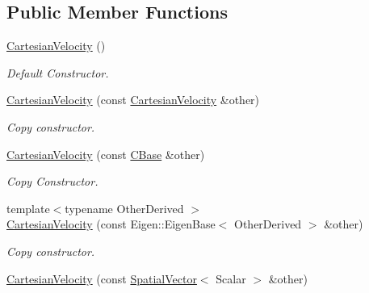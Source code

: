 \subsection*{Public Member Functions}
\begin{DoxyCompactItemize}
\item 
\hyperlink{classow__core_1_1CartesianVelocity_a9101c643b5b96005b9fa87439c6bf805}{Cartesian\+Velocity} ()\hypertarget{classow__core_1_1CartesianVelocity_a9101c643b5b96005b9fa87439c6bf805}{}\label{classow__core_1_1CartesianVelocity_a9101c643b5b96005b9fa87439c6bf805}

\begin{DoxyCompactList}\small\item\em Default Constructor. \end{DoxyCompactList}\item 
\hyperlink{classow__core_1_1CartesianVelocity_a8d9b53bcaca5800a969d2a2d7d36b8fa}{Cartesian\+Velocity} (const \hyperlink{classow__core_1_1CartesianVelocity}{Cartesian\+Velocity} \&other)\hypertarget{classow__core_1_1CartesianVelocity_a8d9b53bcaca5800a969d2a2d7d36b8fa}{}\label{classow__core_1_1CartesianVelocity_a8d9b53bcaca5800a969d2a2d7d36b8fa}

\begin{DoxyCompactList}\small\item\em Copy constructor. \end{DoxyCompactList}\item 
\hyperlink{classow__core_1_1CartesianVelocity_aacb93540f78a2241e5ba7ff3d5062980}{Cartesian\+Velocity} (const \hyperlink{classow__core_1_1CartesianBase}{C\+Base} \&other)\hypertarget{classow__core_1_1CartesianVelocity_aacb93540f78a2241e5ba7ff3d5062980}{}\label{classow__core_1_1CartesianVelocity_aacb93540f78a2241e5ba7ff3d5062980}

\begin{DoxyCompactList}\small\item\em Copy Constructor. \end{DoxyCompactList}\item 
{\footnotesize template$<$typename Other\+Derived $>$ }\\\hyperlink{classow__core_1_1CartesianVelocity_a3b2f280aae9e691e428c6317aa608d61}{Cartesian\+Velocity} (const Eigen\+::\+Eigen\+Base$<$ Other\+Derived $>$ \&other)
\begin{DoxyCompactList}\small\item\em Copy constructor. \end{DoxyCompactList}\item 
\hyperlink{classow__core_1_1CartesianVelocity_ae208a0a19c54af5adc072e5170e34333}{Cartesian\+Velocity} (const \hyperlink{classow__core_1_1SpatialVector}{Spatial\+Vector}$<$ Scalar $>$ \&other)\hypertarget{classow__core_1_1CartesianVelocity_ae208a0a19c54af5adc072e5170e34333}{}\label{classow__core_1_1CartesianVelocity_ae208a0a19c54af5adc072e5170e34333}


\end{DoxyCompactItemize}
